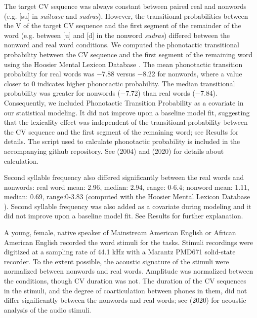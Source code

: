 \documentclass[a4paper,man,natbib,donotrepeattitle, apacite]{apa6}
\begin{document}
The target CV sequence was always constant between paired real and nonwords (e.g. [su] in \textit{suitcase} and \textit{sudras}). However, the transitional probabilities between the V of the target CV sequence and the first segment of the remainder of the word (e.g. between [u] and [d] in the nonword \textit{sudras}) differed between the nonword and real word conditions. We computed the phonotactic transitional probability between the CV sequence and the first segment of the remaining word using the Hoosier Mental Lexicon Database \cite{pisoniSpeechPerceptionWord1985}. The mean phonotactic transition probability for real words was −7.88 versus −8.22 for nonwords, where a value closer to 0 indicates higher phonotactic probability. The median transitional probability was greater for nonwords (−7.72) than real words (−7.84). Consequently, we included Phonotactic Transition Probability as a covariate in our statistical modeling. It did not improve upon a baseline model fit, suggesting that the lexicality effect was independent of the transitional probability between the CV sequence and the first segment of the remaining word; see Results for details. The script used to calculate phonotactic probability is included in the accompanying github repository. See \citeauthor{edwardsInteractionVocabularySize2004} (2004) and \citeauthor{cychoszLexicalAdvantageFouryearold2020} (2020) for details about calculation. 

Second syllable frequency also differed significantly between the real words and nonwords: real word mean: 2.96, median: 2.94, range: 0-6.4; nonword mean: 1.11, median: 0.69, range:0-3.83 (computed with the Hoosier Mental Lexicon Database \cite{pisoniSpeechPerceptionWord1985}). Second syllable frequency was also added as a covariate during modeling and it did not improve upon a baseline model fit. See Results for further explanation.

A young, female, native speaker of Mainstream American English or African American English recorded the word stimuli for the tasks. Stimuli recordings were digitized at a sampling rate of 44.1 kHz with a Marantz PMD671 solid-state recorder. To the extent possible, the acoustic signature of the stimuli were normalized between nonwords and real words. Amplitude was normalized between the conditions, though CV duration was not. The duration of the CV sequences in the stimuli, and the degree of coarticulation between phones in them, did not differ significantly between the nonwords and real words; see \citeauthor{cychoszLexicalAdvantageFouryearold2020} (2020) for acoustic analysis of the audio stimuli.   
\end{document}
